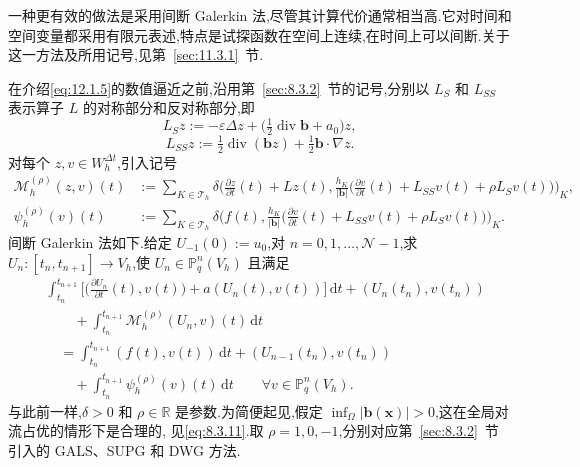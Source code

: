 一种更有效的做法是采用间断 Galerkin 法,尽管其计算代价通常相当高.它对时间和空间变量都采用有限元表述,特点是试探函数在空间上连续,在时间上可以间断.关于这一方法及所用记号,见第~\ref{sec:11.3.1}~节.

在介绍\eqref{eq:12.1.5}的数值逼近之前,沿用第~\ref{sec:8.3.2}~节的记号,分别以 \(L_S\) 和 \(L_{SS}\) 表示算子 \(L\) 的对称部分和反对称部分,即
\begin{equation}\label{eq:12.3.2}
  L_Sz:=-\varepsilon\Delta z
      +\bigl(\tfrac12\operatorname{div}\boldsymbol{b}+a_0\bigr)z,
\end{equation}
\begin{equation}\label{eq:12.3.3}
  L_{SS}z:=\tfrac12\operatorname{div}(\boldsymbol{b}z)+\tfrac12\boldsymbol{b}\cdot\nabla z.
\end{equation}
对每个 \(z,v\in W_h^{\Delta t}\),引入记号
\[
  \begin{aligned}
    \mathcal M_h^{(\rho)}(z,v)(t)
      &:=\sum_{K\in\mathcal T_h}\delta\biggl(\frac{\partial z}{\partial t}(t)+Lz(t),
        \frac{h_K}{|\boldsymbol{b}|}\biggl(\frac{\partial v}{\partial t}(t)
            +L_{SS}v(t)+\rho L_Sv(t)\biggr)\biggr)_K,\\
    \psi_h^{(\rho)}(v)(t)
      &:=\sum_{K\in\mathcal T_h}\delta\biggl(f(t),
        \frac{h_K}{|\boldsymbol{b}|}\biggl(\frac{\partial v}{\partial t}(t)
            +L_{SS}v(t)+\rho L_Sv(t)\biggr)\biggr)_K.
  \end{aligned}
\]
间断 Galerkin 法如下.给定 \(U_{-1}(0):=u_0\),对 \(n=0,1,\ldots,\mathcal N-1\),求 \(U_n\colon[t_n,t_{n+1}]\to V_h\),使 \(U_n\in\mathbb P_q^n(V_h)\) 且满足
\begin{equation}\label{eq:12.3.4}
  \begin{aligned}
    &\int_{t_n}^{t_{n+1}}\biggl[\biggl(\frac{\partial U_n}{\partial t}(t),v(t)\biggr)
       +a(U_n(t),v(t))\biggr]\,\mathrm dt+(U_n(t_n),v(t_n))\\
    &\qquad+\int_{t_n}^{t_{n+1}}\mathcal M_h^{(\rho)}(U_n,v)(t)\,\mathrm dt\\
    &\quad=\int_{t_n}^{t_{n+1}}(f(t),v(t))\,\mathrm dt
           +(U_{n-1}(t_n),v(t_n))\\
    &\qquad+\int_{t_n}^{t_{n+1}}\psi_h^{(\rho)}(v)(t)\,\mathrm dt
      \qquad\forall v\in\mathbb P_q^n(V_h).
  \end{aligned}
\end{equation}
与此前一样,\(\delta>0\) 和 \(\rho\in\mathbb R\) 是参数.为简便起见,假定 \(\inf_\Omega|\boldsymbol{b}(\boldsymbol{x})|>0\),这在全局对流占优的情形下是合理的,
见\eqref{eq:8.3.11}.取 \(\rho=1,0,-1\),分别对应第~\ref{sec:8.3.2}~节引入的 GALS、SUPG 和 DWG 方法.

